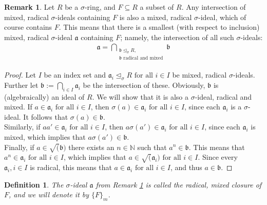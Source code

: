 \documentclass{article}
\def\N{\mathbb{N}}
\def\a{\mathfrak{a}}
\def\b{\mathfrak{b}}
\def\s{\sigma}
\def\si{\unlhd_{\sigma}}
\def\fa{\text{ for all }}
\theoremstyle{plain}
\newtheorem{defn}[Satz]{Definition}
\theoremstyle{definition}
\newtheorem{rem}[Satz]{Remark}
\begin{document}
\begin{rem}\label{wmwelldef}
Let $R$ be a $\s$-ring, and $F \subseteq R$ a subset of $R$. Any intersection of mixed, radical $\s$-ideals containing $F$ is also a mixed, radical $\s$-ideal, which of course contains $F$. 
This means that there is a smallest (with respect to inclusion) mixed, radical $\s$-ideal $\a$ containing $F$; namely, the intersection of all such $\s$-ideals:
\begin{align*} \a = \bigcap_{\substack{ \b \si R, \\ \b \text{ radical and mixed}}} \b \end{align*}
\begin{proof}
Let $I$ be an index set and $\a_i \si R \fa i \in I$ be mixed, radical $\s$-ideals. Further let $\b := \bigcap_{i \in I} \a_i$ be the intersection of these. Obviously, $\b$ is (algebraically) an ideal of $R$. We will show that it is also a $\s$-ideal, radical and mixed.
If $a \in \a_i \fa i \in I$, then $\s(a) \in \a_i \fa i \in I$, since each $\a_i$ is a $\s$-ideal.
It follows that $\s(a) \in \b$. \\
 Similarly, if $aa' \in \a_i \fa i \in I$, then $a \s(a') \in \a_i \fa i \in I$, since each $\a_i$ is mixed, which implies that $a \s(a') \in \b$.  \\
Finally, if $a \in \sqrt(\b)$ there exists an $n \in \N$ such that $a^n \in \b$. This means that $a^n \in \a_i \fa i \in I$, which implies that $a \in \sqrt(\a_i) \fa i \in I$. Since every $\a_i, i \in I$ is radical, this means that $a \in \a_i \fa i \in I$,
and thus $a \in \b$.
\end{proof}
\end{rem}

\begin{defn}
The $\s$-ideal $\a$ from Remark \ref{wmwelldef} is called the radical, mixed closure of $F$, and we will denote it by $\{F\}_{m}$.
\end{defn}
\end{document}
